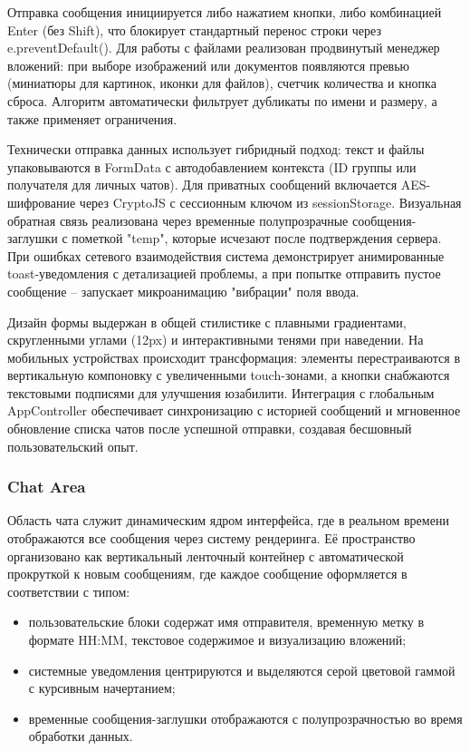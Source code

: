 Отправка сообщения инициируется либо нажатием кнопки, либо комбинацией Enter (без Shift), что блокирует стандартный перенос строки через e.preventDefault(). Для работы с файлами реализован продвинутый менеджер вложений: при выборе изображений или документов появляются превью (миниатюры для картинок, иконки для файлов), счетчик количества и кнопка сброса. Алгоритм автоматически фильтрует дубликаты по имени и размеру, а также применяет ограничения.

Технически отправка данных использует гибридный подход: текст и файлы упаковываются в FormData с автодобавлением контекста (ID группы или получателя для личных чатов). Для приватных сообщений включается AES-шифрование через CryptoJS с сессионным ключом из sessionStorage. Визуальная обратная связь реализована через временные полупрозрачные сообщения-заглушки с пометкой "temp", которые исчезают после подтверждения сервера. При ошибках сетевого взаимодействия система демонстрирует анимированные toast-уведомления с детализацией проблемы, а при попытке отправить пустое сообщение – запускает микроанимацию "вибрации" поля ввода.

Дизайн формы выдержан в общей стилистике с плавными градиентами, скругленными углами (12px) и интерактивными тенями при наведении. На мобильных устройствах происходит трансформация: элементы перестраиваются в вертикальную компоновку с увеличенными touch-зонами, а кнопки снабжаются текстовыми подписями для улучшения юзабилити. Интеграция с глобальным AppController обеспечивает синхронизацию с историей сообщений и мгновенное обновление списка чатов после успешной отправки, создавая бесшовный пользовательский опыт.

\subsubsection{Chat Area}
Область чата служит динамическим ядром интерфейса, где в реальном времени отображаются все сообщения через систему рендеринга. Её пространство организовано как вертикальный ленточный контейнер с автоматической прокруткой к новым сообщениям, где каждое сообщение оформляется в соответствии с типом: 
\begin{itemize}
	\item пользовательские блоки содержат имя отправителя, временную метку в формате HH:MM, текстовое содержимое и визуализацию вложений;
	\item системные уведомления центрируются и выделяются серой цветовой гаммой с курсивным начертанием; 
	\item временные сообщения-заглушки отображаются с полупрозрачностью во время обработки данных.
\end{itemize}

